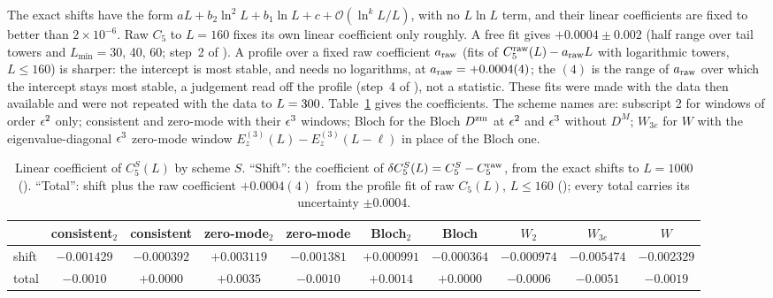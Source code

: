 The exact shifts have the form $aL+b_2\ln^2L+b_1\ln L+c+\mathcal O(\ln^kL/L)$, with no $L\ln L$ term, and their linear
coefficients are fixed to better than $2\times10^{-6}$. Raw $C_5$ to $L=160$ fixes its own linear coefficient only roughly.
A free fit gives $+0.0004\pm0.002$ (half range over tail towers and $L_{\min}=30$, 40, 60; step~2 of
). A profile over a fixed raw coefficient $a_{\rm raw}$ (fits of $C_5^{\rm raw}(L)-a_{\rm
raw}L$ with logarithmic towers, $L\le160$) is sharper: the intercept is most stable, and needs no logarithms, at
$a_{\rm raw}=+0.0004(4)$; the $(4)$ is the range of $a_{\rm raw}$ over which the intercept stays most stable, a
judgement read off the profile (step~4 of ), not a statistic. These fits were made with the data then available and were not repeated with the data to
$L=300$. Table~\ref{htp:d2:tab:c5lin} gives the coefficients. The scheme names are: subscript 2 for windows of order
$\epsilon^2$ only; consistent and zero-mode with their $\epsilon^3$ windows; Bloch for the Bloch $D^{\rm zm}$ at $\epsilon^2$ and
$\epsilon^3$ without $D^M$; $W_{3e}$ for $W$ with the eigenvalue-diagonal $\epsilon^3$ zero-mode window
$E_z^{(3)}(L)-E_z^{(3)}(L-\ell)$ in place of the Bloch one.

\begin{table}[ht]
\centering\footnotesize\setlength{\tabcolsep}{2.6pt}\renewcommand{\arraystretch}{1.15}
\begin{tabular}{@{}lccccccccc@{}}
\toprule
 & consistent$_2$ & consistent & zero-mode$_2$ & zero-mode & Bloch$_2$ & Bloch & $W_2$ & $W_{3e}$ & $W$ \\\midrule
shift & $-0.001429$ & $-0.000392$ & $+0.003119$ & $-0.001381$ & $+0.000991$ & $-0.000364$ & $-0.000974$ & $-0.005474$ & $-0.002329$ \\
total & $-0.0010$ & $+0.0000$ & $+0.0035$ & $-0.0010$ & $+0.0014$ & $+0.0000$ & $-0.0006$ & $-0.0051$ & $-0.0019$ \\
\bottomrule
\end{tabular}
\caption{Linear coefficient of $C_5^S(L)$ by scheme $S$. ``Shift'': the coefficient of $\delta C_5^S(L)=C_5^S-C_5^{\rm raw}$,
from the exact shifts to $L=1000$ (). ``Total'': shift plus the raw
coefficient $+0.0004(4)$ from the profile fit of raw $C_5(L)$, $L\le160$ (); every total
carries its uncertainty $\pm0.0004$.}
\label{htp:d2:tab:c5lin}
\end{table}

